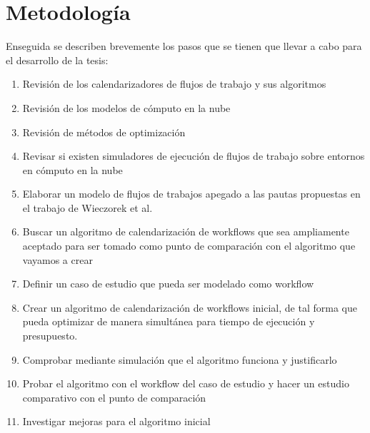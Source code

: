 \documentclass[letterpaper]{report}
\begin{document}
\section*{Metodología}
Enseguida se describen brevemente los pasos que se tienen que llevar a cabo para el desarrollo de la tesis:
\begin{enumerate}
\item Revisión de los calendarizadores de flujos de trabajo y sus algoritmos
\item Revisión de los modelos de cómputo en la nube
\item Revisión de métodos de optimización
\item Revisar si existen simuladores de ejecución de flujos de trabajo sobre entornos en cómputo en la nube
\item Elaborar un modelo de flujos de trabajos apegado a las pautas propuestas en el trabajo de Wieczorek et al. \cite{wieczorek2009towards}
\item Buscar un algoritmo de calendarización de workflows que sea ampliamente aceptado para ser tomado como punto de comparación con el algoritmo que vayamos a crear
\item Definir un caso de estudio que pueda ser modelado como workflow
\item Crear un algoritmo de calendarización de workflows inicial, de tal forma que pueda optimizar de manera simultánea para tiempo de ejecución y presupuesto.
\item Comprobar mediante simulación que el algoritmo funciona y justificarlo
\item Probar el algoritmo con el workflow del caso de estudio y hacer un estudio comparativo con el punto de comparación
\item Investigar mejoras para el algoritmo inicial
\end{enumerate}



\end{document}
